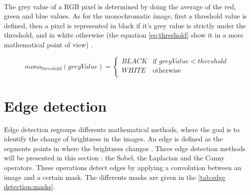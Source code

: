 ~~

The grey value of a RGB pixel is determined by doing the average of the red, green and blue values. As for the monochromatic image, first a threshold value is defined, then a pixel is represented in black if it's grey value is strictly under the threshold, and in white otherwise (the equation \ref{eq:threshold} show it in a more mathematical point of view) \cite{bib:image:Threshold}.

\begin{equation} \label{eq:threshold}
mono_{threshold}(greyValue) = 
	\begin{cases}
		BLACK & \text{if } greyValue < threshold \\
		WHITE & \text{otherwise} \\ 
	\end{cases}
\end{equation}







\section{Edge detection}

Edge detection regroups differents mathematical methods, where the goal is to identify the change of brightness in the images. An edge is defined as the segments points in where the brightness changes \cite{bib:filter:wikipedia}. Three edge detection methods will be presented in this section : the Sobel, the Laplacian and the Canny operators. These operations detect edges by applying a convolution between an image and a certain mask. The differents masks are given in the \vref{tab:edge detection:masks}.

